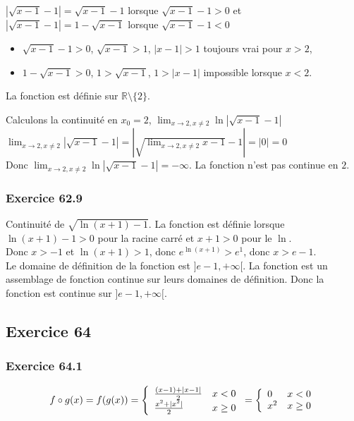 \documentclass[]{book}
\theoremstyle{definition}
\newcommand{\bb}[1]{\mathbb{#1}}
\newcommand{\R}{\bb{R}}
\begin{document}
$|\sqrt{x-1}-1| = \sqrt{x-1}-1$ lorsque $\sqrt{x-1}-1 > 0$ et $|\sqrt{x-1}-1| = 1-\sqrt{x-1}$ lorsque $\sqrt{x-1}-1 < 0$

\begin{itemize}
\item $\sqrt{x-1}-1 > 0$, $\sqrt{x-1} > 1$, $|x-1| > 1$ toujours vrai pour $x > 2$, 
\item $1-\sqrt{x-1} > 0$, $1>\sqrt{x-1}$, $1 > |x-1|$ impossible lorsque $x<2$.
\end{itemize}

La fonction est d\'efinie sur $\R \setminus \{2\}$.

Calculons la continuit\'e en $x_0= 2$, $\lim_{x \to 2, x \neq 2} \ln|\sqrt{x-1}-1|$\\
$\lim_{x \to 2, x \neq 2} |\sqrt{x-1}-1| = |\sqrt{\lim_{x \to 2, x \neq 2}x-1}-1| = |0| = 0$\\
Donc $\lim_{x \to 2, x \neq 2} \ln|\sqrt{x-1}-1| = -\infty$. La fonction n'est pas continue en $2$.

\subsubsection*{Exercice 62.9}
Continuit\'e de $\sqrt{\ln(x+1)-1}$. La fonction est d\'efinie lorsque $\ln(x+1)-1 > 0$ pour la racine carr\'e et $x+1>0$ pour le $\ln$.\\
Donc $x>-1$ et $\ln(x+1) > 1$, donc $e^{\ln(x+1)} > e^1$, donc $x > e - 1$.\\

Le domaine de d\'efinition de la fonction est $]e-1, +\infty[$. La fonction est un assemblage de fonction continue sur leurs domaines de d\'efinition. Donc la fonction est continue sur $]e-1, +\infty[$.


\subsection*{Exercice 64}
\subsubsection*{Exercice 64.1}

$$f \circ g(x) = f(g(x)) = 
\left\{ 
\begin{array}{l l}
\frac{(x-1)+|x-1|}{2} & x < 0\\
\frac{x^2+|x^2|}{2} & x \geq 0\\
\end{array}
\right.
=
\left\{ 
\begin{array}{l l}
0 & x < 0\\
x^2 & x \geq 0\\
\end{array}
\right.
$$
\end{document}
